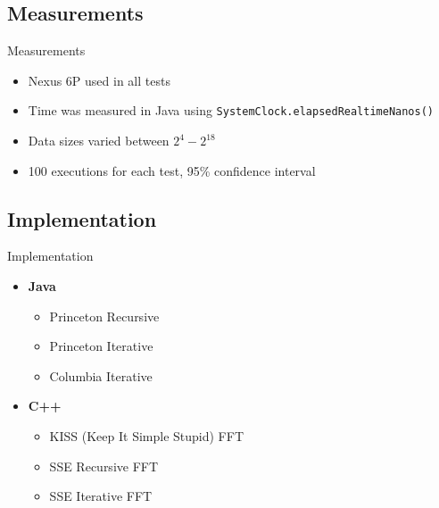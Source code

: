 \documentclass[xcolor={table}]{beamer}
\begin{document}
\subsection{Measurements}
\begin{frame}{Measurements}
    \begin{itemize}
        \item Nexus 6P used in all tests
        \item Time was measured in Java using \texttt{SystemClock.elapsedRealtimeNanos()}
        \item Data sizes varied between $2^4 - 2^{18}$
        \item 100 executions for each test, 95\% confidence interval
    \end{itemize}
\end{frame}

\subsection{Implementation}

\begin{frame}{Implementation}
    \begin{itemize}[<+->]
        \item \textbf{Java}
            \begin{itemize}[<.->]
                \item Princeton Recursive
                \item Princeton Iterative
                \item Columbia Iterative
            \end{itemize}
        \item \textbf{C++}
            \begin{itemize}[<.->]
                \item KISS (Keep It Simple Stupid) FFT
                \item SSE Recursive FFT
                \item SSE Iterative FFT
            \end{itemize}
    \end{itemize}
\end{frame}
\end{document}
